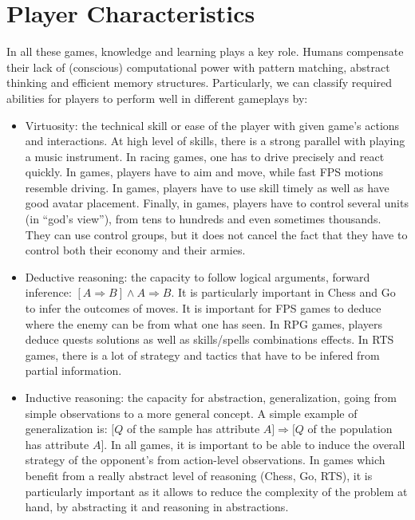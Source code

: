 
\section{Player Characteristics}

In all these games, knowledge and learning plays a key role. Humans compensate their lack of (conscious) computational power with pattern matching, abstract thinking and efficient memory structures. Particularly, we can classify required abilities for players to perform well in different gameplays by:
\begin{itemize}
    \item Virtuosity: the technical skill or ease of the player with given game's actions and interactions. At high level of skills, there is a strong parallel with playing a music instrument. In racing games, one has to drive precisely and react quickly. In  games, players have to aim and move, while fast FPS motions resemble driving. In  games, players have to use skill timely as well as have good avatar placement. Finally, in  games, players have to control several units (in ``god's view''), from tens to hundreds and even sometimes thousands. They can use control groups, but it does not cancel the fact that they have to control both their economy and their armies.
    \item Deductive reasoning: the capacity to follow logical arguments, forward inference: $[A \Rightarrow B] \wedge A \Rightarrow B$. It is particularly important in Chess and Go to infer the outcomes of moves. It is important for FPS games to deduce where the enemy can be from what one has seen. In RPG games, players deduce quests solutions as well as skills/spells combinations effects. In RTS games, there is a lot of strategy and tactics that have to be infered from partial information.
    \item Inductive reasoning: the capacity for abstraction, generalization, going from simple observations to a more general concept. A simple example of generalization is: $[Q$ of the sample has attribute $A] \Rightarrow [Q$ of the population has attribute $A]$. In all games, it is important to be able to induce the overall strategy of the opponent's from action-level observations. In games which benefit from a really abstract level of reasoning (Chess, Go, RTS), it is particularly important as it allows to reduce the complexity of the problem at hand, by abstracting it and reasoning in abstractions.

\end{itemize}
